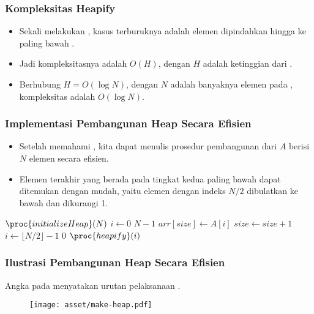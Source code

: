 \begin{frame}
\frametitle{Kompleksitas Heapify}
\begin{itemize}
  \item Sekali melakukan , kasus terburuknya adalah elemen  dipindahkan hingga ke paling bawah \ftree.
  \item Jadi kompleksitasnya adalah $O(H)$, dengan $H$ adalah ketinggian dari .
  \item Berhubung $H = O(\log{N})$, dengan $N$ adalah banyaknya elemen pada \pheap, kompleksitas  adalah $O(\log{N})$.
\end{itemize}
\end{frame}

\begin{frame}
\frametitle{Implementasi Pembangunan Heap Secara Efisien}
\begin{itemize}
  \item Setelah memahami , kita dapat menulis prosedur pembangunan \pheap dari \farray $A$ berisi $N$ elemen secara efisien.
  \item Elemen terakhir yang berada pada tingkat kedua paling bawah dapat ditemukan dengan mudah, yaitu elemen dengan indeks $N/2$ dibulatkan ke bawah dan dikurangi 1.
\end{itemize}
\begin{codebox}
\li $\proc{initializeHeap}(N)$
\li \For $i \gets 0$ \To $N-1$ \Do
\li   $arr[size] \gets A[i]$
\li   $size \gets size + 1$
    \End
\li \For $i \gets \lfloor N/2 \rfloor - 1$ \To $0$ \Do
\li   $\proc{heapify}(i)$
    \End
\end{codebox}

\end{frame}

\begin{frame}
\frametitle{Ilustrasi Pembangunan Heap Secara Efisien}
Angka pada \fnode menyatakan urutan pelaksanaan .
\begin{figure}
  \texttt{[image: asset/make-heap.pdf]}
\end{figure}
\end{frame}

